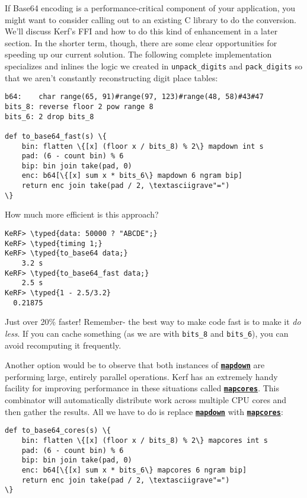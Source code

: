 \documentclass{article}
\newcommand{\typed}[1]{\textcolor{TealBlue}{#1}}
\newcommand{\primu}[2]{\hyperref[prim:#2]{\textbf{\texttt{#1}}}}
\newcommand{\comb}[1]{\primu{#1}{#1}}
\begin{document}
\pagebreak
If Base64 encoding is a performance-critical component of your application, you might want to consider calling out to an existing C library to do the conversion. We'll discuss Kerf's FFI and how to do this kind of enhancement in a later section. In the shorter term, though, there are some clear opportunities for speeding up our current solution. The following complete implementation specializes and inlines the logic we created in \texttt{unpack\_digits} and \texttt{pack\_digits} so that we aren't constantly reconstructing digit place tables:
\begin{Verbatim}
b64:    char range(65, 91)#range(97, 123)#range(48, 58)#43#47
bits_8: reverse floor 2 pow range 8
bits_6: 2 drop bits_8

def to_base64_fast(s) \{
	bin: flatten \{[x] (floor x / bits_8) % 2\} mapdown int s
	pad: (6 - count bin) % 6
	bip: bin join take(pad, 0)
	enc: b64[\{[x] sum x * bits_6\} mapdown 6 ngram bip]
	return enc join take(pad / 2, \textasciigrave"=")
\}
\end{Verbatim}

How much more efficient is this approach?
\begin{Verbatim}
KeRF> \typed{data: 50000 ? "ABCDE";}
KeRF> \typed{timing 1;}
KeRF> \typed{to_base64 data;}
    3.2 s
KeRF> \typed{to_base64_fast data;}
    2.5 s
KeRF> \typed{1 - 2.5/3.2}
  0.21875
\end{Verbatim}
Just over 20\% faster! Remember- the best way to make code fast is to make it \emph{do less}. If you can cache something (as we are with \texttt{bits\_8} and \texttt{bits\_6}), you can avoid recomputing it frequently.

\vspace{0.5cm}

\label{mapcoresBase64}
Another option would be to observe that both instances of \comb{mapdown} are performing large, entirely parallel operations. Kerf has an extremely handy facility for improving performance in these situations called \comb{mapcores}. This combinator will automatically distribute work across multiple CPU cores and then gather the results. All we have to do is replace \comb{mapdown} with \comb{mapcores}:
\begin{Verbatim}
def to_base64_cores(s) \{
	bin: flatten \{[x] (floor x / bits_8) % 2\} mapcores int s
	pad: (6 - count bin) % 6
	bip: bin join take(pad, 0)
	enc: b64[\{[x] sum x * bits_6\} mapcores 6 ngram bip]
	return enc join take(pad / 2, \textasciigrave"=")
\}
\end{Verbatim}
\end{document}
